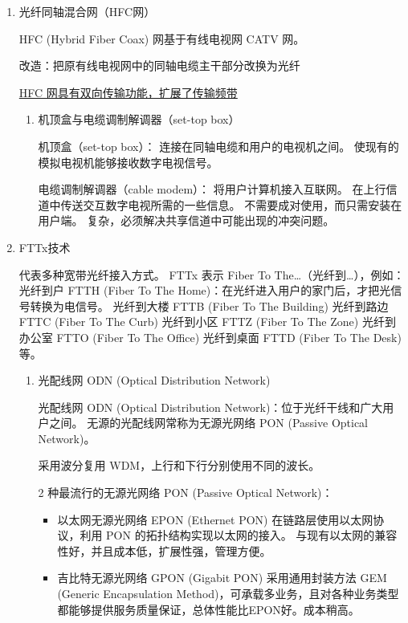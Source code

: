 \documentclass[11pt]{article}
\begin{document}
\begin{enumerate}
\item 光纤同轴混合网（HFC网）
\label{sec:org01d9ea1}

HFC (Hybrid Fiber Coax) 网基于有线电视网 CATV 网。

改造：把原有线电视网中的同轴电缆主干部分改换为光纤

\uline{HFC 网具有双向传输功能，扩展了传输频带}

\begin{enumerate}
\item 机顶盒与电缆调制解调器（set-top box）
\label{sec:org9938d97}

机顶盒（set-top box）：
  连接在同轴电缆和用户的电视机之间。
  使现有的模拟电视机能够接收数字电视信号。

电缆调制解调器（cable modem）：
  将用户计算机接入互联网。
  在上行信道中传送交互数字电视所需的一些信息。
  不需要成对使用，而只需安装在用户端。
  复杂，必须解决共享信道中可能出现的冲突问题。
\end{enumerate}

\item FTTx技术
\label{sec:org5e360dd}

代表多种宽带光纤接入方式。
FTTx 表示 Fiber To The…（光纤到…），例如：
光纤到户 FTTH (Fiber To The Home)：在光纤进入用户的家门后，才把光信号转换为电信号。
光纤到大楼 FTTB (Fiber To The Building)
光纤到路边 FTTC (Fiber To The Curb)
光纤到小区 FTTZ (Fiber To The Zone)
光纤到办公室 FTTO (Fiber To The Office)
光纤到桌面 FTTD (Fiber To The Desk) 等。

\begin{enumerate}
\item 光配线网 ODN (Optical Distribution Network)
\label{sec:org503fc44}

光配线网 ODN (Optical Distribution Network)：位于光纤干线和广大用户之间。
无源的光配线网常称为无源光网络 PON (Passive Optical Network)。

采用波分复用 WDM，上行和下行分别使用不同的波长。

2 种最流行的无源光网络 PON (Passive Optical Network)：
\begin{itemize}
\item 以太网无源光网络 EPON (Ethernet PON)
在链路层使用以太网协议，利用 PON 的拓扑结构实现以太网的接入。
与现有以太网的兼容性好，并且成本低，扩展性强，管理方便。
\item 吉比特无源光网络 GPON (Gigabit PON)
采用通用封装方法 GEM (Generic Encapsulation Method)，可承载多业务，且对各种业务类型都能够提供服务质量保证，总体性能比EPON好。成本稍高。
\end{itemize}
\end{enumerate}
\end{enumerate}
\end{document}
